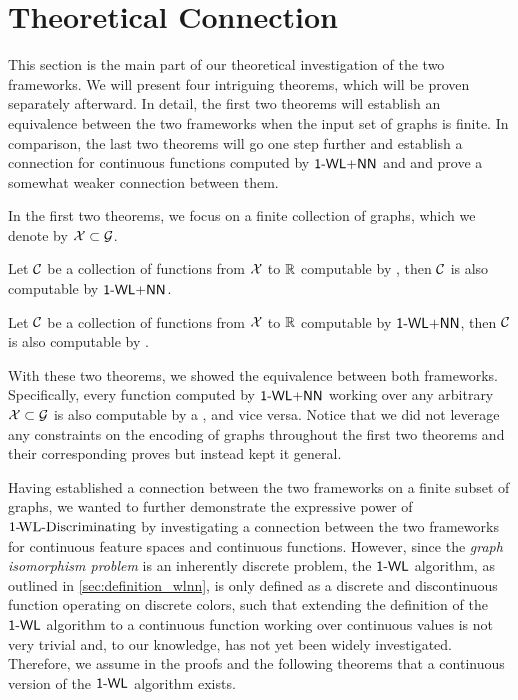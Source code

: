 
\section{Theoretical Connection}\label{sec:theo_connections}
This section is the main part of our theoretical investigation of the two frameworks. We will present four intriguing theorems, which will be proven separately afterward. In detail, the first two theorems will establish an equivalence between the two frameworks when the input set of graphs is finite. In comparison, the last two theorems will go one step further and establish a connection for continuous functions computed by $\textsf{1-WL+NN}$ and \gnns and prove a somewhat weaker connection between them.

In the first two theorems, we focus on a finite collection of graphs, which we denote by $\mathcal{X} \subset \mathcal{G}$.
\begin{theorem}\label{theorem:1wl_in_gnn}
    Let $\mathcal{C}$ be a collection of functions from $\mathcal{X}$ to $\mathbb{R}$ computable by \gnns, then $\mathcal{C}$ is also computable by $\textsf{1-WL+NN}$.
\end{theorem}

\begin{theorem}\label{theorem:gnn_in_1wl}
    Let $\mathcal{C}$ be a collection of functions from $\mathcal{X}$ to $\mathbb{R}$ computable by $\textsf{1-WL+NN}$, then $\mathcal{C}$ is also computable by \gnns.
\end{theorem}
With these two theorems, we showed the equivalence between both frameworks. Specifically, every function computed by $\textsf{1-WL+NN}$ working over any arbitrary $\mathcal{X} \subset \mathcal{G}$ is also computable by a \gnn, and vice versa. Notice that we did not leverage any constraints on the encoding of graphs throughout the first two theorems and their corresponding proves but instead kept it general. 

Having established a connection between the two frameworks on a finite subset of graphs, we wanted to further demonstrate the expressive power of $\text{1-\!WL-Discriminating}$ by investigating a connection between the two frameworks for continuous feature spaces and continuous functions. However, since the \textit{graph isomorphism problem} is an inherently discrete problem, the $\textsf{1-WL}$ algorithm, as outlined in \cref{sec:definition_wlnn}, is only defined as a discrete and discontinuous function operating on discrete colors, such that extending the definition of the $\textsf{1-WL}$ algorithm to a continuous function working over continuous values is not very trivial and, to our knowledge, has not yet been widely investigated. Therefore, we assume in the proofs and the following theorems that a continuous version of the $\textsf{1-WL}$ algorithm exists. 

